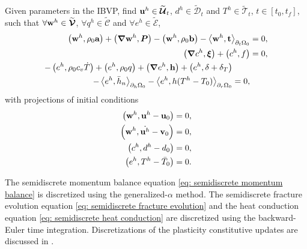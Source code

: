 \begin{mdframed}[
    frametitle={The semidiscrete Galerkin form},
    frametitlebackgroundcolor=gray!20,
    backgroundcolor=gray!5,
    linewidth=0pt,
    nobreak=true
  ]
  Given parameters in the IBVP, find $\textbf{u}^h \in \widetilde{\boldsymbol{\mathcal{U}}}_t$, $d^h \in \widetilde{\mathcal{D}}_t$ and $T^h \in \widetilde{\mathcal{T}}_t$, $t \in [t_0, t_f]$, such that $\forall \textbf{w}^h \in \widetilde{\boldsymbol{\mathcal{V}}}$, $\forall q^h \in \widetilde{\mathcal{C}}$ and $\forall e^h \in \widetilde{\mathcal{E}}$,
  \begin{subequations}
    \begin{align}
      \left( \textbf{w}^h, \rho_0\textbf{a} \right) + \left( \boldsymbol{\nabla} \textbf{w}^h, \boldsymbol{P} \right) - \left( \textbf{w}^h, \rho_0 \textbf{b} \right) - \left< \textbf{w}^h, \textbf{t} \right>_{\partial_t\Omega_0} & = 0, \label{eq: semidiscrete momentum balance}   \\
      \left( \boldsymbol{\nabla} c^h, \boldsymbol{\xi} \right) + \left( c^h, f \right)                                                                                                   & = 0, \label{eq: semidiscrete fracture evolution} \\
      \begin{split}
        - \left( e^h, \rho_0c_v\dot{T} \right) + \left( e^h, \rho_0q \right) + \left( \boldsymbol{\nabla} e^h, \textbf{h} \right) + \left( e^h, \delta+\delta_T \right)& \\
        - \left< e^h, \bar{h}_n \right>_{\partial_h\Omega_0} - \left< e^h, h(T^h-T_0) \right>_{\partial_r\Omega_0} &= 0,
      \end{split} \label{eq: semidiscrete heat conduction}
    \end{align}
  \end{subequations}
  with projections of initial conditions
  \begin{subequations}
    \begin{align}
      \left( \textbf{w}^h, \textbf{u}^h - \textbf{u}_0 \right)       & = 0, \\
      \left( \textbf{w}^h, \dot{\textbf{u}^h} - \textbf{v}_0 \right) & = 0, \\
      \left( c^h, d^h - d_0 \right)                & = 0, \\
      \left( e^h, T^h - \bar{T}_0 \right)          & = 0. 
    \end{align}
  \end{subequations}
\end{mdframed}
The semidiscrete momentum balance equation \eqref{eq: semidiscrete momentum balance} is discretized using the generalized-$\alpha$ method. The semidiscrete fracture evolution equation \eqref{eq: semidiscrete fracture evolution} and the heat conduction equation \eqref{eq: semidiscrete heat conduction} are discretized using the backward-Euler time integration. Discretizations of the plasticity constitutive updates are discussed in .
